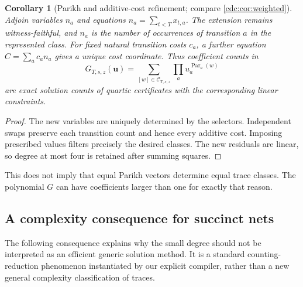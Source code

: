 \documentclass[11pt,a4paper]{article}
\newtheorem{corollary}[corollary]{Corollary}
\theoremstyle{definition}
\theoremstyle{remark}
\newcommand{\Par}{\operatorname{Par}}
\begin{document}
\begin{corollary}[Parikh and additive-cost refinement; compare \cref{cdc:cor:weighted}]\label{cdc:wf:cor:parikh}
Adjoin variables $n_a$ and equations $n_a=\sum_{t<T}x_{t,a}$. The extension remains witness-faithful, and $n_a$ is the number of occurrences of transition $a$ in the represented class. For fixed natural transition costs $c_a$, a further equation $C=\sum_a c_a n_a$ gives a unique cost coordinate. Thus coefficient counts in
\[
 G_{T,s,z}(\mathbf u)=\sum_{[w]\in\mathcal C_{T,s,z}}
                 \prod_a u_a^{\Par_a(w)}
\]
are exact solution counts of quartic certificates with the corresponding linear constraints.
\end{corollary}
\begin{proof}
The new variables are uniquely determined by the selectors. Independent swaps preserve each transition count and hence every additive cost. Imposing prescribed values filters precisely the desired classes. The new residuals are linear, so degree at most four is retained after summing squares.
\end{proof}

This does not imply that equal Parikh vectors determine equal trace classes. The polynomial $G$ can have coefficients larger than one for exactly that reason.

\subsection{A complexity consequence for succinct nets}
The following consequence explains why the small degree should not be interpreted as an efficient generic solution method. It is a standard counting-reduction phenomenon instantiated by our explicit compiler, rather than a new general complexity classification of traces.
\end{document}
